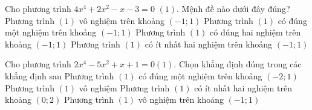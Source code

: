 \begin{ex}%
	Cho phương trình $4x^4+2x^2-x-3=0$ $(1)$.  Mệnh đề nào dưới đây đúng?
	\choice 
		{Phương trình $(1)$ vô nghiệm  trên khoảng $\left(-1; 1\right)$}
		{Phương trình $(1)$ có đúng một nghiệm trên  khoảng $\left(-1; 1\right)$}
		{Phương trình $(1)$ có  đúng hai nghiệm trên khoảng $\left(-1; 1\right)$}
		{\True Phương trình $(1)$ có ít  nhất hai nghiệm trên khoảng $\left(-1; 1\right)$}
\end{ex}

\begin{ex}%
	Cho phương trình $2x^4-5x^2+x+1=0(1)$. Chọn khẳng định  đúng trong các khẳng định sau
	 \choice
		{Phương  trình $(1)$ có đúng một nghiệm trên khoảng $\left(-2; 1\right)$}
		{Phương trình $(1)$ vô nghiệm} 
		{\True Phương trình $(1)$ có ít  nhất hai nghiệm trên khoảng $\left(0; 2\right)$}
		{Phương  trình $(1)$ vô nghiệm trên khoảng $\left(-1; 1\right)$}
\end{ex}


